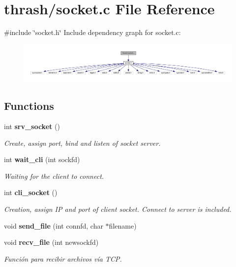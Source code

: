 \section{thrash/socket.c File Reference}
\label{socket_8c}
{\ttfamily \#include \char`\"{}socket.\+h\char`\"{}}\newline
Include dependency graph for socket.\+c\+:
\nopagebreak
\begin{figure}[H]
\begin{center}
\leavevmode
\includegraphics[width=350pt]{socket_8c__incl}
\end{center}
\end{figure}
\subsection*{Functions}
\begin{DoxyCompactItemize}
\item 
int \textbf{ srv\+\_\+socket} ()
\begin{DoxyCompactList}\small\item\em Create, assign port, bind and listen of socket server. \end{DoxyCompactList}\item 
int \textbf{ wait\+\_\+cli} (int sockfd)
\begin{DoxyCompactList}\small\item\em Waiting for the client to connect. \end{DoxyCompactList}\item 
int \textbf{ cli\+\_\+socket} ()
\begin{DoxyCompactList}\small\item\em Creation, assign IP and port of client socket. Connect to server is included. \end{DoxyCompactList}\item 
void \textbf{ send\+\_\+file} (int connfd, char $\ast$filename)
\item 
void \textbf{ recv\+\_\+file} (int newsockfd)
\begin{DoxyCompactList}\small\item\em Función para recibir archivos vía T\+CP. \end{DoxyCompactList}\end{DoxyCompactItemize}


